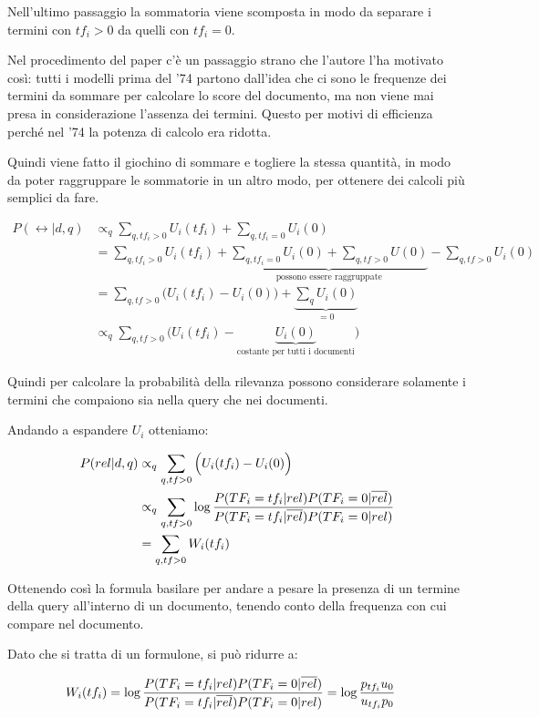 Nell'ultimo passaggio la sommatoria viene scomposta in modo da separare i termini con $tf_i > 0$ da quelli con $tf_i = 0$.

Nel procedimento del paper c'è un passaggio strano che l'autore l'ha motivato così: tutti i modelli prima del '74 partono dall'idea che ci sono le frequenze dei termini da sommare per calcolare lo score del documento, ma non viene mai presa in considerazione l'assenza dei termini.
Questo per motivi di efficienza perché nel '74 la potenza di calcolo era ridotta.

Quindi viene fatto il giochino di sommare e togliere la stessa quantità, in modo da poter raggruppare le sommatorie in un altro modo, per ottenere dei calcoli più semplici da fare.

\begin{align}
P(\rel | d,q) &\propto_q \sum_{q,tf_i > 0} U_i(tf_i) + \sum_{q,tf_i = 0} U_i(0) \nonumber \\
&= \sum_{q,tf_i > 0} U_i(tf_i) + \underbrace{\sum_{q,tf_i = 0} U_i(0) + \sum_{q, tf > 0} U(0)}_{\text{possono essere raggruppate}} - \sum_{q, tf > 0} U_i(0) \nonumber \\
&= \sum_{q, tf>0} \Big( U_i(tf_i) - U_i(0) \Big) + \underbrace{\sum_q U_i(0)}_{= 0}  \nonumber \\
&\propto_q \sum_{q, tf>0} \Big( U_i(tf_i) - \underbrace{U_i(0)}_{\text{costante per tutti i documenti}} \Big)
\end{align}

Quindi per calcolare la probabilità della rilevanza possono considerare solamente i termini che compaiono sia nella query che nei documenti.

Andando a espandere $U_i$ otteniamo:

\begin{align}
P(rel | d,q) &\propto_q \sum_{q, tf>0} \Big( U_i(tf_i) - U_i(0) \Big) \nonumber \\
&\propto_q \sum_{q, tf>0} \log\frac{ P(TF_i = tf_i | rel) P(TF_i = 0 | \overline{rel}) }{P(TF_i = tf_i | \overline{rel}) P(TF_i = 0 | rel)} \label{eq:basic-prob}\\
&= \sum_{q, tf>0} W_i(tf_i)
\end{align}

Ottenendo così la formula basilare per andare a pesare la presenza di un termine della query all'interno di un documento, tenendo conto della frequenza con cui compare nel documento.

Dato che si tratta di un formulone, si può ridurre a:

\begin{align}
W_i(tf_i) &= \log\frac{ P(TF_i = tf_i | rel) P(TF_i = 0 | \overline{rel}) }{P(TF_i = tf_i | \overline{rel}) P(TF_i = 0 | rel)} = \log \frac{p_{tf_i} u_0}{u_{tf_i} p_0} \label{eq:basic-weight}
\end{align}

